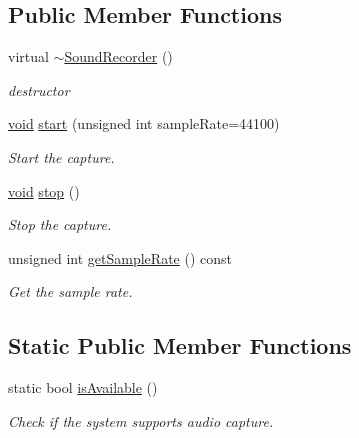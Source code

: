 \subsection*{Public Member Functions}
\begin{DoxyCompactItemize}
\item 
virtual \hyperlink{classsf_1_1_sound_recorder_acc599e61aaa47edaae88cf43f0a43549}{$\sim$\-Sound\-Recorder} ()
\begin{DoxyCompactList}\small\item\em destructor \end{DoxyCompactList}\item 
\hyperlink{glutf90_8h_ac778d6f63f1aaf8ebda0ce6ac821b56e}{void} \hyperlink{classsf_1_1_sound_recorder_a777e633114f7221cd7554a6ed486259e}{start} (unsigned int sample\-Rate=44100)
\begin{DoxyCompactList}\small\item\em Start the capture. \end{DoxyCompactList}\item 
\hyperlink{glutf90_8h_ac778d6f63f1aaf8ebda0ce6ac821b56e}{void} \hyperlink{classsf_1_1_sound_recorder_a8d9c8346aa9aa409cfed4a1101159c4c}{stop} ()
\begin{DoxyCompactList}\small\item\em Stop the capture. \end{DoxyCompactList}\item 
unsigned int \hyperlink{classsf_1_1_sound_recorder_a1f3726cbe0a2b2b291b36beea57960d7}{get\-Sample\-Rate} () const 
\begin{DoxyCompactList}\small\item\em Get the sample rate. \end{DoxyCompactList}\end{DoxyCompactItemize}
\subsection*{Static Public Member Functions}
\begin{DoxyCompactItemize}
\item 
static bool \hyperlink{classsf_1_1_sound_recorder_aab2bd0fee9e48d6cfd449b1cb078ce5a}{is\-Available} ()
\begin{DoxyCompactList}\small\item\em Check if the system supports audio capture. \end{DoxyCompactList}\end{DoxyCompactItemize}
